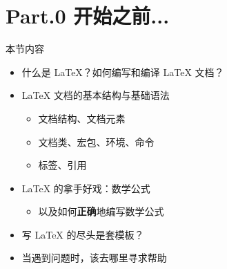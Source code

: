 \documentclass[aspectratio=43]{ctexbeamer}
\author{45gfg9}
\begin{document}


\section{Part.0 开始之前...}

\begin{frame}{本节内容}
\begin{itemize}
    \item 什么是 \LaTeX{}？如何编写和编译 \LaTeX{} 文档？
    \item \LaTeX{} 文档的基本结构与基础语法
    \begin{itemize}
        \item 文档结构、文档元素
        \item 文档类、宏包、环境、命令
        \item 标签、引用
    \end{itemize}
    \pause
    \item \LaTeX{} 的拿手好戏：数学公式
    \begin{itemize}
        \item 以及如何\textbf{正确}地编写数学公式
    \end{itemize}
    \item 写 \LaTeX{} 的尽头是套模板？
    \item 当遇到问题时，该去哪里寻求帮助
\end{itemize}
\end{frame}
\end{document}

